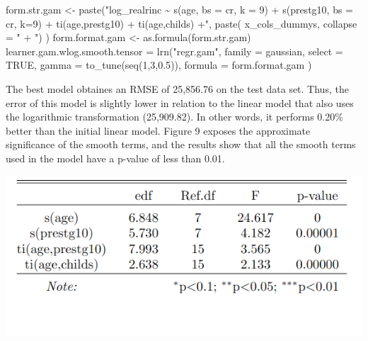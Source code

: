 \documentclass[11pt,a4paper]{article}
\let\origfigure\figure
\let\endorigfigure\endfigure
\renewenvironment{figure}[1][2] {
    \expandafter\origfigure\expandafter[H]
} {
    \endorigfigure
}
\newenvironment{Shaded}{\begin{snugshade}}{\end{snugshade}}
\newcommand{\AttributeTok}[1]{\textcolor[rgb]{0.77,0.63,0.00}{#1}}
\newcommand{\ConstantTok}[1]{\textcolor[rgb]{0.00,0.00,0.00}{#1}}
\newcommand{\DecValTok}[1]{\textcolor[rgb]{0.00,0.00,0.81}{#1}}
\newcommand{\FloatTok}[1]{\textcolor[rgb]{0.00,0.00,0.81}{#1}}
\newcommand{\FunctionTok}[1]{\textcolor[rgb]{0.00,0.00,0.00}{#1}}
\newcommand{\NormalTok}[1]{#1}
\newcommand{\OtherTok}[1]{\textcolor[rgb]{0.56,0.35,0.01}{#1}}
\newcommand{\StringTok}[1]{\textcolor[rgb]{0.31,0.60,0.02}{#1}}
\begin{document}
\begin{Shaded}
\begin{Highlighting}[]
\NormalTok{form.str.gam }\OtherTok{\textless{}{-}} \FunctionTok{paste}\NormalTok{(}\StringTok{"log\_realrinc \textasciitilde{} s(age, bs = \textquotesingle{}cr\textquotesingle{}, k = 9) }
\StringTok{                                    + s(prestg10, bs = \textquotesingle{}cr\textquotesingle{}, k=9) + }
\StringTok{                        ti(age,prestg10) + ti(age,childs) +"}\NormalTok{,}
                       \FunctionTok{paste}\NormalTok{( x\_cols\_dummys, }\AttributeTok{collapse =} \StringTok{" + "}\NormalTok{) )}
\NormalTok{form.format.gam }\OtherTok{\textless{}{-}} \FunctionTok{as.formula}\NormalTok{(form.str.gam)}
\NormalTok{learner.gam.wlog.smooth.tensor }\OtherTok{=} \FunctionTok{lrn}\NormalTok{(}\StringTok{"regr.gam"}\NormalTok{,}
                                     \AttributeTok{family =} \StringTok{\textquotesingle{}gaussian\textquotesingle{}}\NormalTok{,}
                                     \AttributeTok{select =} \ConstantTok{TRUE}\NormalTok{,}
                                     \AttributeTok{gamma =} \FunctionTok{to\_tune}\NormalTok{(}\FunctionTok{seq}\NormalTok{(}\DecValTok{1}\NormalTok{,}\DecValTok{3}\NormalTok{,}\FloatTok{0.5}\NormalTok{)),}
                                     \AttributeTok{formula =}\NormalTok{ form.format.gam}
\NormalTok{)}
\end{Highlighting}
\end{Shaded}

The best model obtaines an RMSE of 25,856.76 on the test data set. Thus,
the error of this model is slightly lower in relation to the linear
model that also uses the logarithmic transformation (25,909.82). In
other words, it performs 0.20\% better than the initial linear model.
Figure 9 exposes the approximate significance of the smooth terms, and
the results show that all the smooth terms used in the model have a
p-value of less than 0.01.

\begin{figure}
\includegraphics[width=0.8\linewidth]{includes/aprox_smooth} \caption{Approximate Significance of Smooth Terms}\label{fig:unnamed-chunk-3}
\end{figure}
\end{document}
